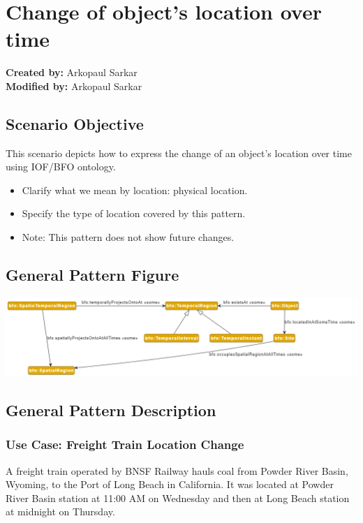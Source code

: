 \section{Change of object's location over time}
\label{sec-change-location}

\textbf{Created by:} Arkopaul Sarkar \\
\textbf{Modified by:} Arkopaul Sarkar \\

\subsection*{Scenario Objective}

This scenario depicts how to express the change of an object's location over time using IOF/BFO ontology.

\begin{itemize}
    \item  Clarify what we mean by location: physical location.
    \item Specify the type of location covered by this pattern.
    \item Note: This pattern does not show future changes.
\end{itemize}


\subsection*{General Pattern Figure}
\includegraphics[scale=0.38]{scenarios/location-change/images/change-location-general.png}

\subsection*{General Pattern Description}

\subsubsection*{Use Case: Freight Train Location Change} 
A freight train operated by BNSF Railway hauls coal from Powder River Basin, Wyoming, to the Port of Long Beach in California. It was located at Powder River Basin station at 11:00 AM on Wednesday and then at Long Beach station at midnight on Thursday.

